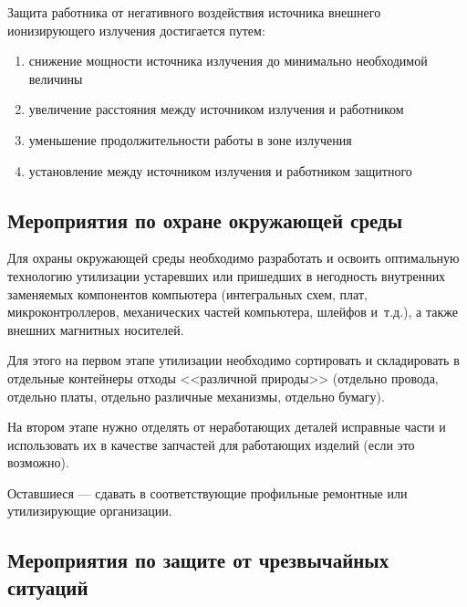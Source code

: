 Защита работника от негативного воздействия источника внешнего ионизирующего излучения достигается путем:

\begin{enumerate}
	\item снижение мощности источника излучения до минимально необходимой величины 
	\item увеличение расстояния между источником излучения и работником 
	\item уменьшение продолжительности работы в зоне излучения 
	\item установление между источником излучения и работником защитного
\end{enumerate}


\subsection{Мероприятия по охране окружающей среды}

Для охраны окружающей среды необходимо разработать и освоить оптимальную технологию утилизации устаревших или пришедших в негодность внутренних заменяемых компонентов компьютера (интегральных схем, плат, микроконтроллеров, механических частей компьютера, шлейфов и~т.д.), а также внешних магнитных носителей.

Для этого на первом этапе утилизации необходимо сортировать и складировать в отдельные контейнеры отходы <<различной природы>> (отдельно провода, отдельно платы, отдельно различные механизмы, отдельно бумагу).

На втором этапе нужно отделять от неработающих деталей исправные части и использовать их в качестве запчастей для работающих изделий (если это возможно).

Оставшиеся --- сдавать в соответствующие профильные ремонтные или утилизирующие организации.

\subsection{Мероприятия по защите от чрезвычайных ситуаций}

